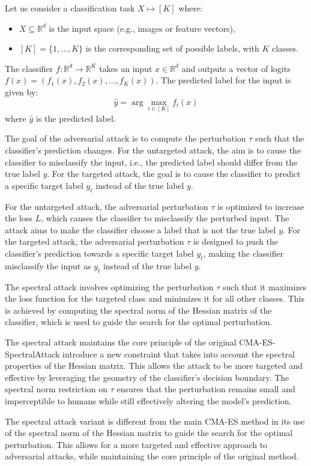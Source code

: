Let us consider a classification task \( X \mapsto [K] \) where:
\begin{itemize}
    \item \( X \subseteq \mathbb{R}^d \) is the input space (e.g., images or feature vectors),
    \item \( [K] = \{1, ..., K\} \) is the corresponding set of possible labels, with \( K \) classes.
\end{itemize}

The classifier \( f : \mathbb{R}^d \to \mathbb{R}^K \) takes an input \( x \in \mathbb{R}^d \) and outputs a vector of logits \( f(x) = (f_1(x), f_2(x), \dots, f_K(x)) \). The predicted label for the input is given by:
\[
\hat{y} = \arg \max_{i \in [K]} f_i(x)
\]
where \( \hat{y} \) is the predicted label.

The goal of the adversarial attack is to compute the perturbation \( \tau \) such that the classifier's prediction changes. For the untargeted attack, the aim is to cause the classifier to misclassify the input, i.e., the predicted label should differ from the true label \( y \). For the targeted attack, the goal is to cause the classifier to predict a specific target label \( y_t \) instead of the true label \( y \).

For the untargeted attack, the adversarial perturbation \( \tau \) is optimized to increase the loss \( L \), which causes the classifier to misclassify the perturbed input. The attack aims to make the classifier choose a label that is not the true label \( y \). For the targeted attack, the adversarial perturbation \( \tau \) is designed to push the classifier's prediction towards a specific target label \( y_t \), making the classifier misclassify the input as \( y_t \) instead of the true label \( y \).

The spectral attack involves optimizing the perturbation \( \tau \) such that it maximizes the loss function for the targeted class and minimizes it for all other classes. This is achieved by computing the spectral norm of the Hessian matrix of the classifier, which is used to guide the search for the optimal perturbation.

The spectral attack maintains the core principle of the original
CMA-ES-SpectralAttack introduce a new constraint that takes into account the spectral properties of the Hessian matrix. This allows the attack to be more targeted and effective by leveraging the geometry of the classifier's decision boundary. The spectral norm restriction on \( \tau \) ensures that the perturbation remains small and imperceptible to humans while still effectively altering the model's prediction.

The spectral attack variant is different from the main CMA-ES method in its use of the spectral norm of the Hessian matrix to guide the search for the optimal perturbation. This allows for a more targeted and effective approach to adversarial attacks, while maintaining the core principle of the original method.